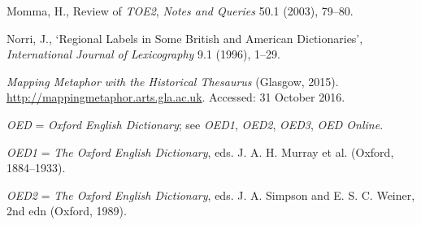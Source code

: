 \begin{list}{}
\item %
Momma, H., Review of \textit{TOE2}, \textit{Notes and Queries} 50.1 (2003), 79–80.




\item %
Norri, J., `Regional Labels in Some British and American Dictionaries', \textit{International Journal of Lexicography} 9.1 (1996), 1–29.


\item %
\textit{Mapping Metaphor with the Historical Thesaurus} (Glasgow, 2015). \url{http://mappingmetaphor.arts.gla.ac.uk}. Accessed: 31 October 2016.

\item %
\textit{OED} = \textit{Oxford English Dictionary}; see \textit{OED1}, \textit{OED2}, \textit{OED3}, \textit{OED Online}. 

\item 
\textit{OED1} = 
\textit{The Oxford English Dictionary}, eds. J. A. H. Murray et al. (Oxford, 1884–1933).


\item 
\textit{OED2} = 
\textit{The Oxford English Dictionary}, eds. J. A. Simpson and E. S. C. Weiner, 2nd edn (Oxford, 1989). 


\end{list}
